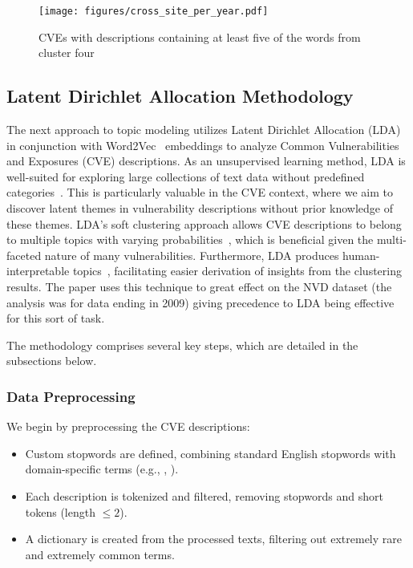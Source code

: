 \begin{figure}[t]
	\begin{center}

		\texttt{[image: figures/cross\_site\_per\_year.pdf]}
	\end{center}

	\caption{\label{fig:cross_site_per_year}CVEs with descriptions containing at least five of the words from cluster four}
\end{figure}


\subsection{Latent Dirichlet Allocation Methodology}

The next approach to topic modeling utilizes Latent Dirichlet Allocation (LDA)~\cite{lda_origin} in conjunction with Word2Vec~\cite{word2vec} embeddings to analyze Common Vulnerabilities and Exposures (CVE) descriptions. As an unsupervised learning method, LDA is well-suited for exploring large collections of text data without predefined categories~\cite{lda_origin, latent_handbook}. This is particularly valuable in the CVE context, where we aim to discover latent themes in vulnerability descriptions without prior knowledge of these themes. LDA's soft clustering approach allows CVE descriptions to belong to multiple topics with varying probabilities~\cite{latent_handbook}, which is beneficial given the multi-faceted nature of many vulnerabilities. Furthermore, LDA produces human-interpretable topics~\cite{lda_origin}, facilitating easier derivation of insights from the clustering results. The paper \cite{cve_topic_modelling} uses this technique to great effect on the NVD dataset (the analysis was for data ending in 2009) giving precedence to LDA being effective for this sort of task.

The methodology comprises several key steps, which are detailed in the subsections below.

\subsubsection{Data Preprocessing} We begin by preprocessing the CVE descriptions:

\begin{itemize}
	\item Custom stopwords are defined, combining standard English stopwords with domain-specific terms (e.g., , ).
	\item Each description is tokenized and filtered, removing stopwords and short tokens (length $\leq 2$).
	\item A dictionary is created from the processed texts, filtering out extremely rare and extremely common terms.
\end{itemize}

